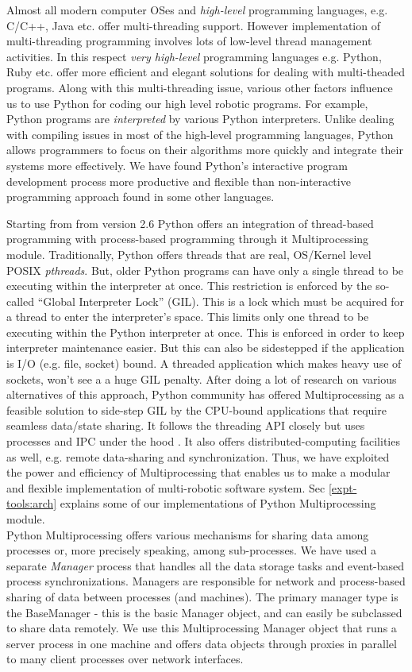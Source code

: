 Almost all modern computer OSes and {\em high-level} programming languages, e.g. C/C++, Java etc. offer multi-threading support. However implementation of multi-threading programming involves lots of low-level thread management activities. In this respect {\em very high-level
} programming languages e.g. Python, Ruby etc. offer more efficient and elegant solutions for dealing with multi-theaded programs. Along with this multi-threading issue, various other factors influence us to use Python for coding our high level robotic programs. For example, Python programs are  {\em interpreted} by various Python interpreters. Unlike dealing with compiling issues in most of the high-level programming languages, Python allows programmers to focus on their  algorithms more quickly and integrate their systems more effectively.  We have found Python's interactive program development process more productive and flexible than non-interactive programming approach found in some other languages. 

Starting from from version 2.6 Python offers an integration of thread-based programming with process-based programming through it Multiprocessing module. Traditionally, Python offers threads that are real, OS/Kernel level POSIX {\em pthreads}.  But, older Python programs can have only a single thread to be executing within
 the interpreter at once. This restriction is enforced by the
  so-called ``Global Interpreter Lock'' (GIL). This is a lock which must be
 acquired for a thread to enter the interpreter’s space.
 This limits only one thread to  be executing within the Python
 interpreter at once.  This is enforced  in order to keep interpreter maintenance easier.
 But this can also be sidestepped if the application is I/O (e.g. file, socket) bound. A threaded application which makes heavy use of sockets, won’t see
 a a huge GIL penalty.  After  doing a lot of research on various alternatives of this approach, Python community has offered Multiprocessing as a feasible solution to side-step GIL by the CPU-bound applications that  require seamless data/state sharing.   It follows the threading API closely but uses processes and
 IPC under the hood
. It also offers distributed-computing facilities as well, e.g. remote data-sharing and synchronization.  Thus, we have exploited the power and efficiency of Multiprocessing that enables us to make a modular and flexible implementation of multi-robotic software system. Sec \ref{expt-tools:arch} explains some of our implementations of Python Multiprocessing module.\\
Python Multiprocessing offers various mechanisms for sharing data among processes or, more precisely speaking, among sub-processes. We have used a separate {\em Manager} process that handles all the data storage tasks and event-based process synchronizations.  Managers are responsible for network and process-based sharing of data between processes (and machines).
 The primary manager type is the BaseManager - this is the basic Manager object, and can easily be subclassed to share
 data remotely.  We use this Multiprocessing Manager object that runs a server process in one machine and offers data objects through proxies in parallel to many client  processes over network interfaces.
